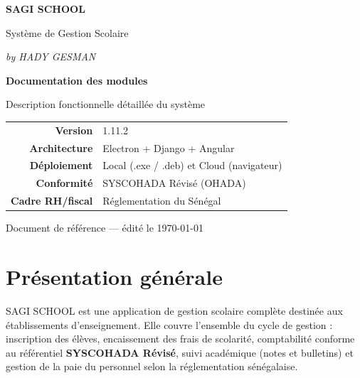 \documentclass[11pt,a4paper]{report}
\begin{document}
\begin{titlepage}
\centering
\vspace*{2.5cm}
{\Huge\bfseries\color{sagiteal} SAGI SCHOOL\par}
\vspace{0.4cm}
{\Large\color{sagidark} Système de Gestion Scolaire\par}
\vspace{0.2cm}
{\large\color{sagigray} \textit{by HADY GESMAN}\par}
\vspace{2.2cm}
{\LARGE\bfseries\color{sagidark} Documentation des modules\par}
\vspace{0.5cm}
{\large\color{sagigray} Description fonctionnelle détaillée du système\par}
\vspace{3cm}

\begin{tabular}{rl}
\textbf{Version} & 1.11.2\\[4pt]
\textbf{Architecture} & Electron + Django + Angular\\[4pt]
\textbf{Déploiement} & Local (.exe / .deb) et Cloud (navigateur)\\[4pt]
\textbf{Conformité} & SYSCOHADA Révisé (OHADA)\\[4pt]
\textbf{Cadre RH/fiscal} & Réglementation du Sénégal\\
\end{tabular}

\vfill
{\small\color{sagigray} Document de référence --- édité le \today\par}
\end{titlepage}

\tableofcontents
\clearpage

\chapter{Présentation générale}

SAGI SCHOOL est une application de gestion scolaire complète destinée aux
établissements d'enseignement. Elle couvre l'ensemble du cycle de gestion :
inscription des élèves, encaissement des frais de scolarité, comptabilité
conforme au référentiel \textbf{SYSCOHADA Révisé}, suivi académique
(notes et bulletins) et gestion de la paie du personnel selon la
réglementation sénégalaise.
\end{document}
